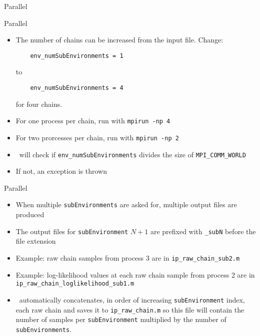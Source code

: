 \begin{frame}{Parallel \Queso}
\begin{figure}
  \end{figure}
\end{frame}

\begin{frame}[fragile]{Parallel \Queso}
  \begin{itemize}
    \item The number of chains can be increased from the input file.  Change:
      \begin{verbatim}
    env_numSubEnvironments = 1 \end{verbatim}
      to
      \begin{verbatim}
    env_numSubEnvironments = 4 \end{verbatim}
      for four chains.
    \item For one process per chain, run with \texttt{mpirun -np 4}
    \item For two prorcesses per chain, run with \texttt{mpirun -np 2}
    \item \Queso\ will check if \texttt{env\_numSubEnvironments} divides
      the size of \texttt{MPI\_COMM\_WORLD}
    \item If not, an exception is thrown
  \end{itemize}
\end{frame}

\begin{frame}[fragile]{Parallel \Queso}
  \begin{itemize}
    \item When multiple \texttt{subEnvironments} are asked for, multiple output
      files are produced
    \item The output files for \texttt{subEnvironment} $N+1$ are prefixed with
      \texttt{\_subN} before the file extension
    \item Example: raw chain samples from process 3 are in
      \texttt{ip\_raw\_chain\_sub2.m}
    \item Example: log-likelihood values at each raw chain sample from process
      2 are in \texttt{ip\_raw\_chain\_loglikelihood\_sub1.m}
    \item \Queso\ automatically concatenates, in order of increasing
      \texttt{subEnvironment} index, each raw chain and saves it to
      \texttt{ip\_raw\_chain.m} so this file will contain the number of samples
      per \texttt{subEnvironment} multiplied by the number of
      \texttt{subEnvironments}.
  \end{itemize}
\end{frame}
